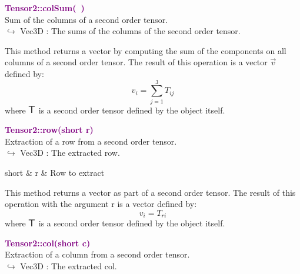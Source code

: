 \textcolor{purple}{\textbf{Tensor2::colSum(~)}}\label{Tensor2::colSum()}\\
Sum of the columns of a second order tensor.\\ \hspace*{10mm}$\hookrightarrow$ Vec3D : The sums of the columns of the second order tensor.

This method returns a vector by computing the sum of the components on all columns of a second order tensor.
The result of this operation is a vector $\overrightarrow{v}$ defined by:
\begin{equation*}
v_{i}=\sum_{j=1}^{3}T_{ij}
\end{equation*}
where $\mbox{\large\ensuremath{\mathsf{T}}}$ is a second order tensor defined by the object itself.

\textcolor{purple}{\textbf{Tensor2::row(short r)}}\label{Tensor2::row(short r)}\\
Extraction of a row from a second order tensor.\\ \hspace*{10mm}$\hookrightarrow$ Vec3D : The extracted row.

\begin{tcolorbox}[width=\textwidth,myArgs,tabularx={ll|R}]
short & r & Row to extract
\end{tcolorbox}

This method returns a vector as part of a second order tensor.
The result of this operation with the argument r is a vector defined by:
\begin{equation*}
v_{i} = T_{ri}
\end{equation*}
where $\mbox{\large\ensuremath{\mathsf{T}}}$ is a second order tensor defined by the object itself.

\textcolor{purple}{\textbf{Tensor2::col(short c)}}\label{Tensor2::col(short c)}\\
Extraction of a column from a second order tensor.\\ \hspace*{10mm}$\hookrightarrow$ Vec3D : The extracted col.

